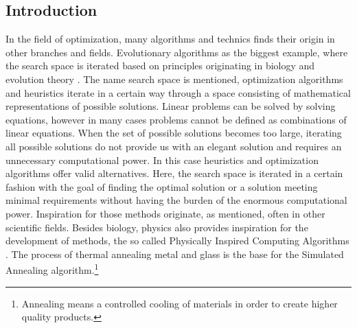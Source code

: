 \subsection{Introduction}
In the field of optimization, many algorithms and technics finds their origin in other branches and fields.
Evolutionary algorithms as the biggest example, where the search space is iterated based on principles originating in biology and evolution theory \cite{Brabazon2015}.
The name search space is mentioned, optimization algorithms and heuristics iterate in a certain way through a space consisting of mathematical representations of possible solutions.
Linear problems can be solved by solving equations, however in many cases problems cannot be defined as combinations of linear equations. 
When the set of possible solutions becomes too large, iterating all possible solutions do not provide us with an elegant solution and requires an unnecessary computational power.
In this case heuristics and optimization algorithms offer valid alternatives. 
Here, the search space is iterated in a certain fashion with the goal of finding the optimal solution or a solution meeting minimal requirements without having the burden of the enormous computational power.
Inspiration for those methods originate, as mentioned, often in other scientific fields. 
Besides biology, physics also provides inspiration for the development of methods, the so called Physically Inspired Computing Algorithms \cite{Brabazon2015}.
The process of thermal annealing metal and glass is the base for the Simulated Annealing algorithm.\footnote{Annealing means a controlled cooling of materials in order to create higher quality products.}

